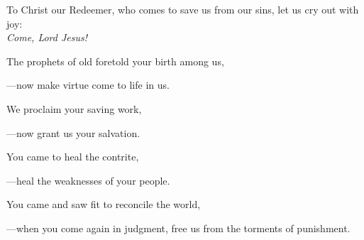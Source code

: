 \intercessions\indent

\begin{hangpar}

To Christ our Redeemer, who comes to save us from our sins, let us cry out with joy:\\
\emph{Come, Lord Jesus!}

\medskip The prophets of old foretold your birth among us,

{\color{red}---\thinspace}now make virtue come to life in us.

\medskip We proclaim your saving work,

{\color{red}---\thinspace}now grant us your salvation.

\medskip You came to heal the contrite,

{\color{red}---\thinspace}heal the weaknesses of your people.

\medskip You came and saw fit to reconcile the world,

{\color{red}---\thinspace}when you come again in judgment, free us from the torments of punishment.

\medskip

\end{hangpar}